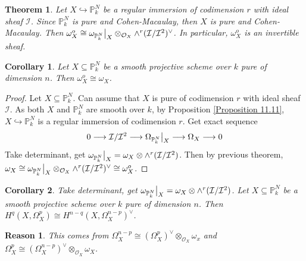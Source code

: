 \documentclass{ctexart}
\newtheorem{theorem}{Theorem}[section]
\newtheorem{reason}{Reason}[section]
\newtheorem{corollary}{Corollary}[section]
\begin{document}
\begin{theorem}
    Let $X \hookrightarrow \mathbb{P}_{k}^{N}$ be a regular immersion of codimension $r$ with ideal sheaf $\mathcal{I}$.
    Since $\mathbb{P}_{k}^{N}$ is pure and Cohen-Macaulay, then $X$ is pure and Cohen-Macaulay.
    Then $\omega_{X}^{o} \cong \omega_{\mathbb{P}_{k}^{N}}\big{|}_{X} \otimes_{\mathcal{O}_{X}} \wedge^{r} (\mathcal{I}/\mathcal{I}^{2})^{\lor}$.
    In particular, $\omega_{X}^{o}$ is an invertible sheaf.
    \label{Theorem 11.4}
\end{theorem}
\begin{corollary}
    Let $X \subseteq \mathbb{P}_{k}^{N}$ be a smooth projective scheme over $k$ pure of dimension $n$.
    Then $\omega_{X}^{o} \cong \omega_{X}$.
    \label{Corollary 11.2}
\end{corollary}
\begin{proof}
    Let $X \subseteq \mathbb{P}_{k}^{N}$.
    Can assume that $X$ is pure of codimension $r$ with ideal sheaf $\mathcal{I}$.
    As both $X$ and $\mathbb{P}_{k}^{N}$ are smooth over $k$, by Proposition \ref{Proposition 11.11}, $X \hookrightarrow \mathbb{P}_{k}^{N}$ is a regular immersion of codimension $r$.
    Get exact sequence 
    \begin{equation*}
        0 \longrightarrow \mathcal{I}/\mathcal{I}^{2} \longrightarrow \Omega_{\mathbb{P}_{k}^{N}}\big{|}_{X} \longrightarrow \Omega_{X} \longrightarrow 0
    \end{equation*}
    Take determinant, get $\omega_{\mathbb{P}_{k}^{N}}\big{|}_{X} = \omega_{X} \otimes \wedge^{r} (\mathcal{I}/\mathcal{I}^{2})$.
    Then by previous theorem, $\omega_{X} \cong \omega_{\mathbb{P}_{k}^{N}}\big{|}_{X} \otimes_{\mathcal{O}_{X}} \wedge^{r} (\mathcal{I}/\mathcal{I}^{2})^{\lor} \cong \omega_{X}^{o}$.
\end{proof}
\begin{corollary}
    Take determinant, get $\omega_{\mathbb{P}_{k}^{N}}\big{|}_{X} = \omega_{X} \otimes \wedge^{r} (\mathcal{I}/\mathcal{I}^{2})$.
    Let $X \subseteq \mathbb{P}_{k}^{N}$ be a smooth projective scheme over $k$ pure of dimension $n$.
    Then $H^{q}(X, \Omega_{X}^{p}) \cong H^{n - q}(X, \Omega_{X}^{n - p})^{\lor}$.
    \label{Corollary 11.3}
\end{corollary}
\begin{reason}
    This comes from $\Omega_{X}^{n - p} \cong (\Omega_{X}^{p})^{\lor} \otimes_{\mathcal{O}_{X}} \omega_{x}$ and $\Omega_{X}^{p} \cong (\Omega_{X}^{n - p})^{\lor} \otimes_{\mathcal{O}_{X}} \omega_{X}$.
\end{reason}
\end{document}
